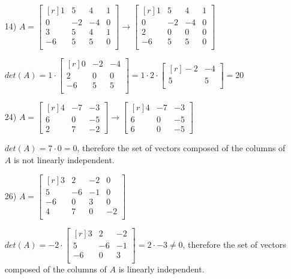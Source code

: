 \documentclass{article}
\begin{document}
\begin{enumerate}
  \item[14)]
  $
  A=\begin{bmatrix*}[r]
    1&5&4&1\\
    0&-2&-4&0\\
    3&5&4&1\\
    -6&5&5&0\\
  \end{bmatrix*}\rightarrow
  \begin{bmatrix*}[r]
    1&5&4&1\\
    0&-2&-4&0\\
    2&0&0&0\\
    -6&5&5&0\\
  \end{bmatrix*}
  $

  $
  det(A)=1\cdot\begin{bmatrix*}[r]
    0&-2&-4\\
    2&0&0\\
    -6&5&5\\
    \end{bmatrix*}=1\cdot2\cdot\begin{bmatrix*}[r]
      -2&-4\\
      5&5\\
    \end{bmatrix*}=20
  $

  \item[24)]
  $
    A=\begin{bmatrix*}[r]
      4&-7&-3\\
      6&0&-5\\
      2&7&-2
      \end{bmatrix*}\rightarrow\begin{bmatrix*}[r]
      4&-7&-3\\
      6&0&-5\\
      6&0&-5
      \end{bmatrix*}
  $

    $det(A)=7\cdot0=0$, therefore the set of vectors 
    composed of the columns of $A$ is not linearly 
    independent.
  \item[26)]
  $
    A=\begin{bmatrix*}[r]
      3&2&-2&0\\
      5&-6&-1&0\\
      -6&0&3&0\\
      4&7&0&-2\\
    \end{bmatrix*}
  $

    $det(A)=-2\cdot\begin{bmatrix*}[r]
      3&2&-2\\
      5&-6&-1\\
      -6&0&3\\
    \end{bmatrix*}=2\cdot-3\neq0$, therefore the set of vectors
    composed of the columns of $A$ is linearly independent.
    \end{enumerate}
\end{document}
